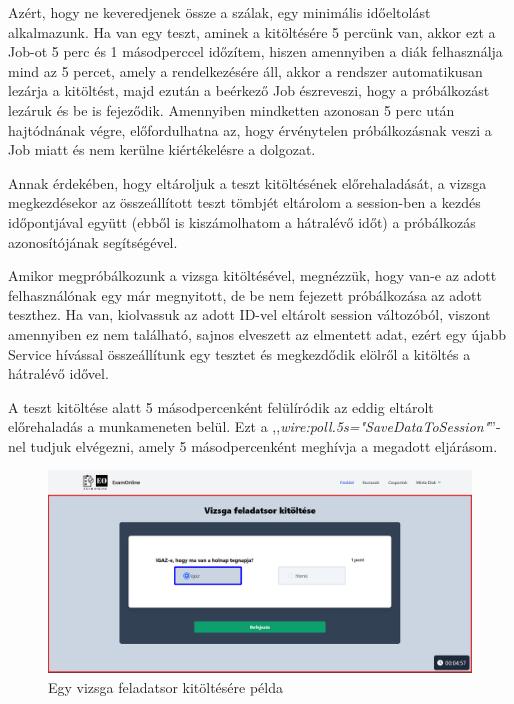 \documentclass[
]{thesis-ekf}
\theoremstyle{definition}
\theoremstyle{remark}
\begin{document}
                    Azért, hogy ne keveredjenek össze a szálak, egy minimális időeltolást alkalmazunk. Ha van egy teszt, aminek a kitöltésére 5 percünk van, akkor ezt a Job-ot 5 perc és 1 másodperccel időzítem, hiszen amennyiben a diák felhasználja mind az 5 percet, amely a rendelkezésére áll, akkor a rendszer automatikusan lezárja a kitöltést, majd ezután a beérkező Job észreveszi, hogy a próbálkozást lezáruk és be is fejeződik. 
                    Amennyiben mindketten azonosan 5 perc után hajtódnának végre, előfordulhatna az, hogy érvénytelen próbálkozásnak veszi a Job miatt és nem kerülne kiértékelésre a dolgozat.

                    Annak érdekében, hogy eltároljuk a teszt kitöltésének előrehaladását, a vizsga megkezdésekor az összeállított teszt tömbjét eltárolom a session-ben a kezdés időpontjával együtt (ebből is kiszámolhatom a hátralévő időt) a próbálkozás azonosítójának segítségével.

                    Amikor megpróbálkozunk a vizsga kitöltésével, megnézzük, hogy van-e az adott felhasználónak egy már megnyitott, de be nem fejezett próbálkozása az adott teszthez. Ha van, kiolvassuk az adott ID-vel eltárolt session változóból, viszont amennyiben ez nem található, sajnos elveszett az elmentett adat, ezért egy újabb Service hívással összeállítunk egy tesztet és megkezdődik elölről a kitöltés a hátralévő idővel.
                    
                    A teszt kitöltése alatt 5 másodpercenként felülíródik az eddig eltárolt előrehaladás a munkameneten belül. Ezt a ,,\emph{wire:poll.5s="SaveDataToSession"}''-nel tudjuk elvégezni, amely 5 másodpercenként meghívja a megadott eljárásom.
                    
                    \begin{figure}[ht!]
    		        \centering
    		        \includegraphics[width=15cm]{Test.write.png}
                        \caption{Egy vizsga feladatsor kitöltésére példa}
    		        \label{fig-teszt-write}
    	           \end{figure}
                
\end{document}
